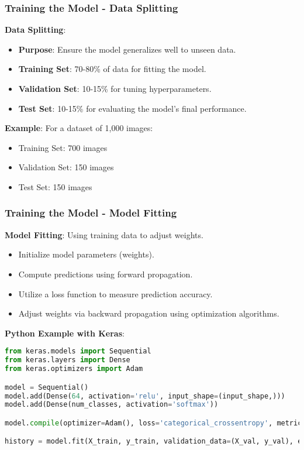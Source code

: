 \documentclass[aspectratio=169]{beamer}
\begin{document}
\begin{frame}[fragile]
    \frametitle{Training the Model - Data Splitting}
    \textbf{Data Splitting}:
    \begin{itemize}
        \item \textbf{Purpose}: Ensure the model generalizes well to unseen data.
        \item \textbf{Training Set}: 70-80\% of data for fitting the model.
        \item \textbf{Validation Set}: 10-15\% for tuning hyperparameters.
        \item \textbf{Test Set}: 10-15\% for evaluating the model's final performance.
    \end{itemize}
    
    \textbf{Example}: For a dataset of 1,000 images:
    \begin{itemize}
        \item Training Set: 700 images
        \item Validation Set: 150 images
        \item Test Set: 150 images
    \end{itemize}
\end{frame}

\begin{frame}[fragile]
    \frametitle{Training the Model - Model Fitting}
    \textbf{Model Fitting}: Using training data to adjust weights.
    \begin{itemize}
        \item Initialize model parameters (weights).
        \item Compute predictions using forward propagation.
        \item Utilize a loss function to measure prediction accuracy.
        \item Adjust weights via backward propagation using optimization algorithms.
    \end{itemize}
    
    \textbf{Python Example with Keras}:
    \begin{lstlisting}[language=Python]
from keras.models import Sequential
from keras.layers import Dense
from keras.optimizers import Adam

model = Sequential()
model.add(Dense(64, activation='relu', input_shape=(input_shape,)))
model.add(Dense(num_classes, activation='softmax'))

model.compile(optimizer=Adam(), loss='categorical_crossentropy', metrics=['accuracy'])

history = model.fit(X_train, y_train, validation_data=(X_val, y_val), epochs=50, batch_size=32)
    \end{lstlisting}
\end{frame}
\end{document}
